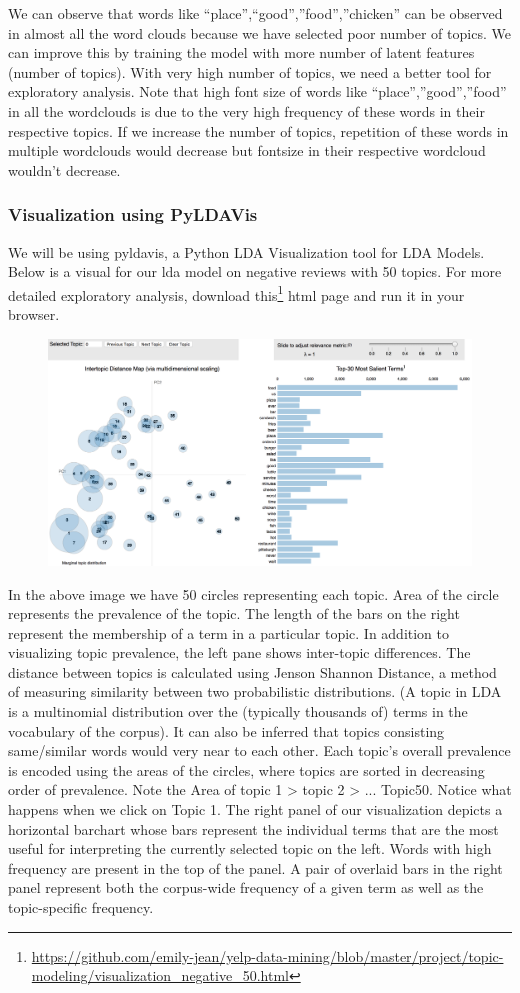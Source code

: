 \documentclass{neu_handout}
\begin{document}
We can observe that words like “place”,“good”,”food”,”chicken” can be observed in almost all the word clouds because we have selected poor number of topics. We can improve this by training the model with more number of latent features (number of topics). With very high number of topics, we need a better tool for exploratory analysis. 
Note that high font size of words like “place”,”good”,”food” in all the wordclouds is due to the very high frequency of these words in their respective topics. If we increase the number of topics, repetition of these words in multiple wordclouds would decrease but fontsize in their respective wordcloud wouldn’t decrease. 

\subsubsection*{Visualization using PyLDAVis}
We will be using pyldavis, a Python LDA Visualization tool for LDA Models. Below is a visual for our lda model on negative reviews with 50 topics. For more detailed exploratory analysis, download this\footnote{\url{https://github.com/emily-jean/yelp-data-mining/blob/master/project/topic-modeling/visualization_negative_50.html}} html page and run it in your browser.

\begin{figure}[h]
\centering
{
\includegraphics[width=0.4\linewidth]{first_image}
}
\end{figure}

In the above image we have 50 circles representing each topic. Area of the circle represents the prevalence of the topic. The length of the bars on the right represent the membership of a term in a particular topic. In addition to visualizing topic prevalence, the left pane shows inter-topic differences. The distance between topics is calculated using Jenson Shannon Distance, a method of measuring similarity between two probabilistic distributions. (A topic in LDA is a multinomial distribution over the (typically thousands of) terms in the vocabulary of the corpus). It can also be inferred that topics consisting same/similar words would very near to each other.
Each topic’s overall prevalence is encoded using the areas of the circles, where topics are sorted in decreasing order of prevalence. Note the Area of topic 1 > topic 2 > ... Topic50.
Notice what happens when we click on Topic 1. The right panel of our visualization depicts a horizontal barchart whose bars represent the individual terms that are the most useful for interpreting the currently selected topic on the left. Words with high frequency are present in the top of the panel. A pair of overlaid bars in the right panel represent both the corpus-wide frequency of a given term as well as the topic-specific frequency.
\end{document}
